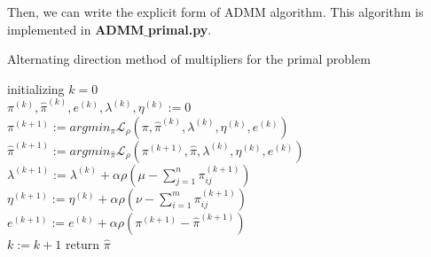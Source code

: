 \documentclass{article}
\begin{document}
\begin{large}
Then, we can write the explicit form of ADMM algorithm. This algorithm is implemented in \textbf{ADMM$\_$primal.py}.

\begin{algorithm}[H]
  \SetAlgoNoLine
  \caption{Alternating direction method of multipliers for the primal problem} 
  initializing $k = 0$\\
  $\pi^{(k)},\hat{\pi}^{(k)},e^{(k)},\lambda^{(k)},\eta^{(k)}:=0$\\
  {  
   $\pi^{(k+1)}:=argmin_{\pi}\mathcal{L}_{\rho}(\pi,\hat{\pi}^{(k)},\lambda^{(k)},\eta^{(k)},e^{(k)})$\\
   $\hat{\pi}^{(k+1)}:=argmin_{\hat{\pi}}\mathcal{L}_{\rho}(\pi^{(k+1)},\hat{\pi},\lambda^{(k)},\eta^{(k)},e^{(k)})$\\
   $\lambda^{(k+1)}:=\lambda^{(k)}+\alpha\rho(\mu-\sum_{j=1}^{n}\pi_{ i j }^{(k+1)})$\\
   $\eta^{(k+1)}:=\eta^{(k)}+\alpha\rho(\nu-\sum_{i=1}^{m}\pi_{ i j }^{(k+1)})$\\
   $e^{(k+1)}:=e^{(k)}+\alpha\rho(\pi^{(k+1)}-\hat{\pi}^{(k+1)})$\\
   $k:= k+1$
  }
  return $\hat{\pi}$
\end{algorithm}


\end{large}
\end{document}
